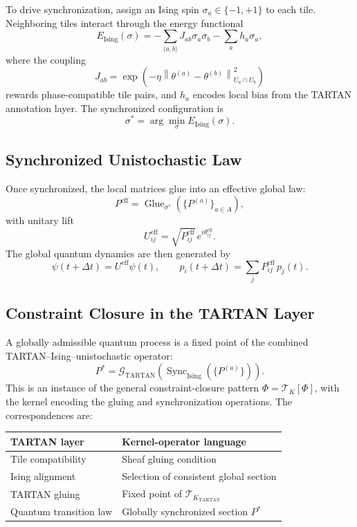 \documentclass[12pt]{article}
\newcommand{\TK}{\mathcal{T}_K}
\begin{document}
To drive synchronization, assign an Ising spin $\sigma_a \in \{-1,+1\}$
to each tile. Neighboring tiles interact through the energy functional
\[
  E_{\mathrm{Ising}}(\sigma) = -\sum_{\langle a,b\rangle} J_{ab}\sigma_a\sigma_b
  - \sum_a h_a\sigma_a,
\]
where the coupling
\[
  J_{ab} = \exp\!\left(-\eta\left\|\theta^{(a)} - \theta^{(b)}\right\|^2_{U_a\cap U_b}\right)
\]
rewards phase-compatible tile pairs, and $h_a$ encodes local bias from
the TARTAN annotation layer. The synchronized configuration is
\[
  \sigma^* = \arg\min_\sigma E_{\mathrm{Ising}}(\sigma).
\]

\subsection{Synchronized Unistochastic Law}

Once synchronized, the local matrices glue into an effective global law:
\[
  P^{\mathrm{eff}} = \operatorname{Glue}_{\sigma^*}\!\left(\{P^{(a)}\}_{a\in A}\right),
\]
with unitary lift
\[
  U^{\mathrm{eff}}_{ij} = \sqrt{P^{\mathrm{eff}}_{ij}}\, e^{i\theta^{\mathrm{eff}}_{ij}}.
\]
The global quantum dynamics are then generated by
\[
  \psi(t+\Delta t) = U^{\mathrm{eff}}\psi(t),
  \qquad
  p_i(t+\Delta t) = \sum_j P^{\mathrm{eff}}_{ij}\, p_j(t).
\]

\subsection{Constraint Closure in the TARTAN Layer}

A globally admissible quantum process is a fixed point of the combined
TARTAN--Ising--unistochastic operator:
\[
  P^* = \mathcal{G}_{\mathrm{TARTAN}}\!\left(
    \operatorname{Sync}_{\mathrm{Ising}}\!\left(\{P^{(a)}\}\right)\right).
\]
This is an instance of the general constraint-closure pattern
$\Phi = \TK[\Phi]$, with the kernel encoding the gluing and synchronization
operations. The correspondences are:

\medskip
\begin{center}
\renewcommand{\arraystretch}{1.3}
\begin{tabular}{ll}
\toprule
\textbf{TARTAN layer} & \textbf{Kernel-operator language} \\
\midrule
Tile compatibility & Sheaf gluing condition \\
Ising alignment & Selection of consistent global section \\
TARTAN gluing & Fixed point of $\mathcal{T}_{K_{\mathrm{TARTAN}}}$ \\
Quantum transition law & Globally synchronized section $P^*$ \\
\bottomrule
\end{tabular}
\end{center}
\medskip
\end{document}
